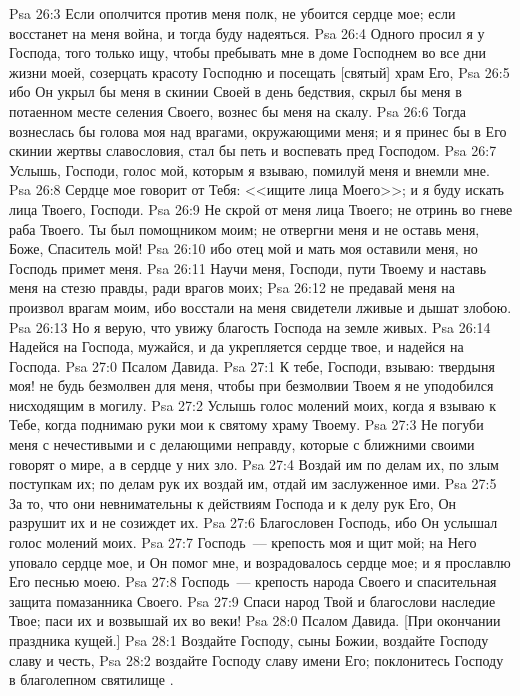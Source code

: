 \vs Psa 26:3 Если ополчится против меня полк, не убоится сердце мое; если восстанет на меня война, и тогда буду надеяться.
\vs Psa 26:4 Одного просил я у Господа, того только ищу, чтобы пребывать мне в доме Господнем во все дни жизни моей, созерцать красоту Господню и посещать [святый] храм Его,
\vs Psa 26:5 ибо Он укрыл бы меня в скинии Своей в день бедствия, скрыл бы меня в потаенном месте селения Своего, вознес бы меня на скалу.
\vs Psa 26:6 Тогда вознеслась бы голова моя над врагами, окружающими меня; и я принес бы в Его скинии жертвы славословия, стал бы петь и воспевать пред Господом.
\vs Psa 26:7 Услышь, Господи, голос мой, которым я взываю, помилуй меня и внемли мне.
\vs Psa 26:8 Сердце мое говорит от Тебя: <<ищите лица Моего>>; и я буду искать лица Твоего, Господи.
\vs Psa 26:9 Не скрой от меня лица Твоего; не отринь во гневе раба Твоего. Ты был помощником моим; не отвергни меня и не оставь меня, Боже, Спаситель мой!
\vs Psa 26:10 ибо отец мой и мать моя оставили меня, но Господь примет меня.
\vs Psa 26:11 Научи меня, Господи, пути Твоему и наставь меня на стезю правды, ради врагов моих;
\vs Psa 26:12 не предавай меня на произвол врагам моим, ибо восстали на меня свидетели лживые и дышат злобою.
\vs Psa 26:13 Но я верую, что увижу благость Господа на земле живых.
\vs Psa 26:14 Надейся на Господа, мужайся, и да укрепляется сердце твое, и надейся на Господа.
\vs Psa 27:0 Псалом Давида.
\rsbpar\vs Psa 27:1 К тебе, Господи, взываю: твердыня моя! не будь безмолвен для меня, чтобы при безмолвии Твоем я не уподобился нисходящим в могилу.
\vs Psa 27:2 Услышь голос молений моих, когда я взываю к Тебе, когда поднимаю руки мои к святому храму Твоему.
\vs Psa 27:3 Не погуби меня с нечестивыми и с делающими неправду, которые с ближними своими говорят о мире, а в сердце у них зло.
\vs Psa 27:4 Воздай им по делам их, по злым поступкам их; по делам рук их воздай им, отдай им заслуженное ими.
\vs Psa 27:5 За то, что они невнимательны к действиям Господа и к делу рук Его, Он разрушит их и не созиждет их.
\vs Psa 27:6 Благословен Господь, ибо Он услышал голос молений моих.
\vs Psa 27:7 Господь~--- крепость моя и щит мой; на Него уповало сердце мое, и Он помог мне, и возрадовалось сердце мое; и я прославлю Его песнью моею.
\vs Psa 27:8 Господь~--- крепость народа Своего и спасительная защита помазанника Своего.
\vs Psa 27:9 Спаси народ Твой и благослови наследие Твое; паси их и возвышай их во веки!
\vs Psa 28:0 Псалом Давида. [При окончании праздника кущей.]
\rsbpar\vs Psa 28:1 Воздайте Господу, сыны Божии, воздайте Господу славу и честь,
\vs Psa 28:2 воздайте Господу славу имени Его; поклонитесь Господу в благолепном святилище .
